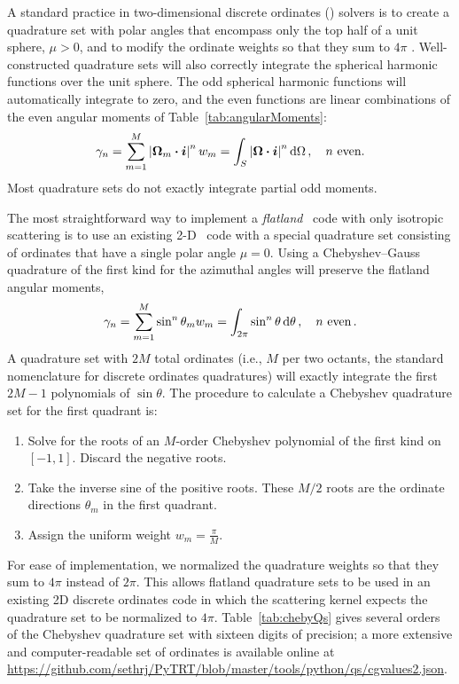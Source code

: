 A standard practice in two-dimensional discrete ordinates (\SN) solvers is to
create a quadrature set with polar angles that encompass only the top half of a
unit sphere, $\mu>0$, and to modify the ordinate weights so that they sum to
$4\pi$
\cite{Zik1997}. Well-constructed quadrature sets will also correctly
integrate the spherical harmonic functions \cite{Rab2007} over the unit sphere.
The odd spherical harmonic functions will automatically integrate to zero, and
the even
functions are linear combinations of the even angular moments of
Table~\ref{tab:angularMoments}:
\begin{equation*}
  \gamma_n
  = \sum_{m=1}^{M} \left|  \bm{\Omega}_m \bm{\cdot} \bm{i} \right|^n w_m
  = \int_S \left|  \bm{\Omega}\bm{\cdot}\bm{i}  \right|^n \mathop{}\!\mathrm{d}\Omega \,,
  \quad n\ \text{even}.
\end{equation*}
Most quadrature sets do not exactly integrate partial odd moments.

The most straightforward way to implement a \emph{flatland} \SN\
code with only isotropic scattering is to use an existing 2-D \SN\ code with a
special quadrature set
consisting of ordinates that have a single
polar angle $\mu=0$. Using a Chebyshev--Gauss quadrature of the first kind
\cite{Str1966a} for the azimuthal angles will preserve the flatland angular moments,
\begin{equation*}
  \gamma_n
  = \sum_{m=1}^{M} \sin^n \theta_m w_m
  = \int_{2\pi} \sin^n \theta \mathop{}\!\mathrm{d}\theta\,,
  \quad n\ \text{even} \,.
\end{equation*}
A quadrature set with $2M$ total ordinates (i.e., $M$ per two octants, the
standard nomenclature for discrete ordinates quadratures) will exactly integrate
the first $2M-1$ polynomials of $\sin \theta$. The procedure to calculate
a Chebyshev quadrature set for the first quadrant is:
\begin{enumerate}
  \item Solve for the roots of an $M$-order Chebyshev polynomial of the first
    kind on $[-1,1]$. Discard the negative roots.
  \item Take the inverse sine of the positive roots. These $M/2$ roots are the
    ordinate directions $\theta_m$ in the first quadrant.
  \item Assign the uniform weight $w_m = \frac{\pi}{M}$.
\end{enumerate}
For ease of implementation, we normalized the quadrature weights so that they sum
to $4\pi$ instead of $2\pi$. This allows flatland quadrature sets to be used in
an existing 2\-D discrete ordinates code in which the scattering kernel expects the
quadrature set to be normalized to $4\pi$. Table~\ref{tab:chebyQs} gives several
orders of the Chebyshev quadrature set with sixteen digits of precision; a more
extensive and computer-readable set of ordinates is available online at
\url{https://github.com/sethrj/PyTRT/blob/master/tools/python/qs/cgvalues2.json}.

